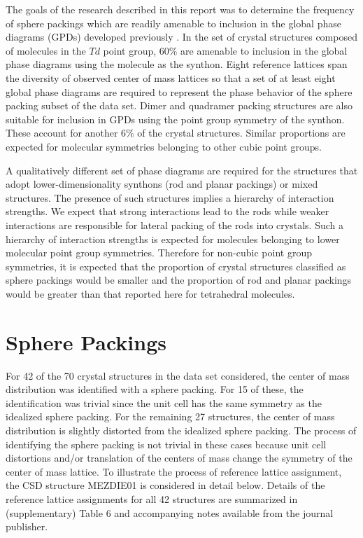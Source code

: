 \documentclass[preprint]{iucr}              %
\begin{document}
The goals of the research described in this report was to determine the frequency of sphere packings which are readily amenable to inclusion in the global phase diagrams (GPDs) developed previously \cite{Keith04c,Mettes04}.  In the set of crystal structures composed of molecules in the $Td$ point group, 60\% are amenable to inclusion in the global phase diagrams using the molecule as the synthon.  Eight reference lattices span the diversity of observed center of mass lattices so that a set of at least eight global phase diagrams are required to represent the phase behavior of the sphere packing subset of the data set.  Dimer and quadramer packing structures are also suitable for inclusion in GPDs using the point group symmetry of the synthon.  These account for another 6\% of the crystal structures.  Similar proportions are expected for molecular symmetries belonging to other cubic point groups.  

A qualitatively different set of phase diagrams are required for the structures that adopt lower-dimensionality synthons (rod and planar packings) or mixed structures.  The presence of such structures implies a hierarchy of interaction strengths.  We expect that strong interactions lead to the rods while weaker interactions are responsible for lateral packing of the rods into crystals.  Such a hierarchy of interaction strengths is expected for molecules belonging to lower molecular point group symmetries.  Therefore for non-cubic point group symmetries, it is expected that the proportion of crystal structures classified as sphere packings would be smaller and the proportion of rod and planar packings would be greater than that reported here for tetrahedral molecules.  



\appendix
\section{Sphere Packings }

For 42 of the 70 crystal structures in the data set considered, the center of mass distribution was identified with a sphere packing.  For 15 of these, the identification was trivial since the unit cell has the same symmetry as the idealized sphere packing.  For the remaining 27 structures, the center of mass distribution is slightly distorted from the idealized sphere packing.  The process of identifying the sphere packing is not trivial in these cases because unit cell distortions and/or translation of the centers of mass change the symmetry of the center of mass lattice.  To illustrate the process of reference lattice assignment, the CSD structure MEZDIE01 is considered in detail below.  Details of the reference lattice assignments for all 42 structures are summarized in (supplementary) Table 6 and accompanying notes available from the journal publisher.
\end{document}
